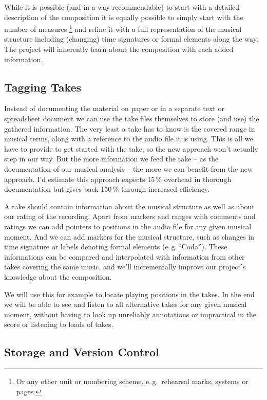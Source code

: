 \documentclass[11pt,a4paper]{article}
\begin{document}
While it is possible (and in a way recommendable) to start with a detailed description of the composition it is equally possible to simply start with the number of measures%
\footnote{Or any other unit or numbering scheme, e.\,g.\ rehearsal marks, systems or pages.}
and refine it with a full representation of the musical structure including (changing) time signatures or formal elements along the way.
The project will inherently learn about the composition with each added information.

\subsection{Tagging Takes}
Instead of documenting the material on paper or in a separate text or spreadsheet document we can use the take files themselves to store (and use) the gathered information.
The very least a take has to know is the covered range in musical terms, along with a reference to the audio file it is using.
This is all we have to provide to get started with the take, so the new approach won't actually step in our way.
But the more information we feed the take -- as the documentation of our musical analysis -- the more we can benefit from the new approach.
I'd estimate this approach expects 15\,\% overhead in thorough documentation but gives back 150\,\% through increased efficiency.

A take should contain information about the musical structure as well as about our rating of the recording.
Apart from markers and ranges with comments and ratings we can add pointers to positions in the audio file for any given musical moment. 
And we can add markers for the musical structure, such as changes in time signature or labels denoting formal elements (e.\,g.\,“Coda”).
These informations can be compared and interpolated with information from other takes covering the same music, and we'll incrementally improve our project's knowledge about the composition.

We will use this for example to locate playing positions in the takes.
In the end we will be able to see and listen to all alternative takes for any given musical moment, without having to look up unreliably annotations or impractical in the score or listening to loads of takes.

\subsection{Storage and Version Control}
\end{document}
